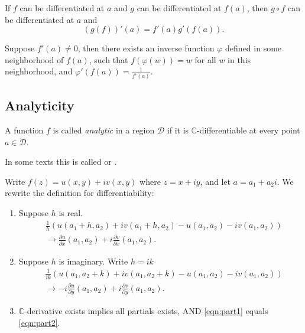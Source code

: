 
\begin{theorem}
	If $f$ can be differentiated at $a$ and $g$ can be differentiated at $f(a)$, then $g \circ f$ can be differentiated at $a$ and \[
		\left( g(f) \right) ' (a) = f'(a) g'(f(a))
	.\] 
\end{theorem}

\begin{corollary}
	Suppose $f'(a)\neq 0$, then there exists an inverse function $ \varphi$ defined in some neighborhood of $f(a)$, such that $f(\varphi(w)) = w$ for all $w$ in this neighborhood, and $\varphi'(f(a)) = \frac{1}{f'(a)}$.
\end{corollary}

\subsection{Analyticity}

\begin{definition}
	A function $f$ is called \textit{analytic} in a region $\mathcal{D}$ if it is $\mathbb{C}$-differentiable at every point $a \in \mathcal{D}$.

	In some texts this is called  or .
\end{definition}

Write $f(z) = u(x,y) + iv(x,y)$ where $z = x+iy$, and let $a = a_1 + a_2 i$. We rewrite the definition for differentiability:

\begin{enumerate}
	\item Suppose $h$ is real.
	\begin{align}
		&\frac{1}{h}\left( u(a_1+h, a_2) + i v(a_1 + h, a_2) - u(a_1, a_2) - iv(a_1, a_2) \right)\nonumber \\
		&\to \frac{\partial u}{\partial x} (a_1, a_2) 
		+ i\frac{\partial v}{\partial x} (a_1, a_2)\label{eqn:part1}
	.\end{align} 
\item Suppose $h$ is imaginary. Write $h = ik$
\begin{align}
		&\frac{1}{ik}\left( u(a_1, a_2+k) + i v(a_1, a_2+k) - u(a_1, a_2) - iv(a_1, a_2) \right)\nonumber \\
		&\to - i \frac{\partial u}{\partial y} (a_1, a_2) 
		+ i\frac{\partial v}{\partial y} (a_1, a_2)\label{eqn:part2}
	.\end{align}
\item $\mathbb{C}$-derivative exists implies all partials exists, AND \eqref{eqn:part1} equals \eqref{eqn:part2}.
\end{enumerate}

